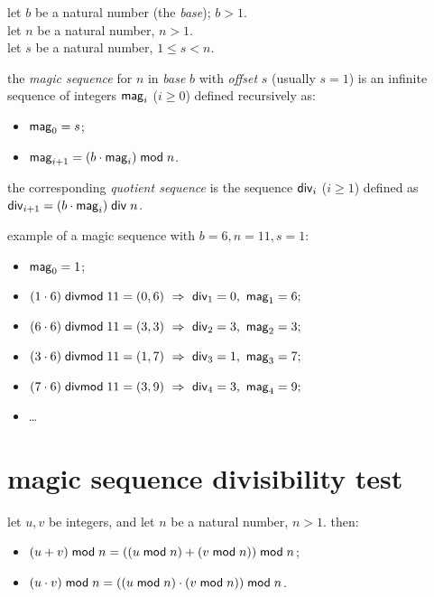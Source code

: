 \documentclass[a4paper, 12pt]{report}
\begin{document}
\begin{definition}
	let $b$ be a natural number (the \emph{base}); $b > 1$. \\
	let $n$ be a natural number, $n > 1$. \\
	let $s$ be a natural number, $1 \leq s < n$. \medskip

	the \emph{magic sequence} for $n$ in \emph{base} $b$ with \emph{offset} $s$ (usually $s = 1$) is an infinite sequence of integers $\mathsf{mag}_i$ ($i \geq 0$) defined recursively as:

	\begin{itemize}
		\item $\mathsf{mag}_0 = s$;
		\item $\mathsf{mag}_{i + 1} = (b \cdot \mathsf{mag}_i) \;\mathsf{mod}\; n$.
	\end{itemize}

	the corresponding \emph{quotient sequence} is the sequence $\mathsf{div}_i$ ($i \geq 1$) defined as \\ $\mathsf{div}_{i + 1} = (b \cdot \mathsf{mag}_i) \;\mathsf{div}\; n$.
\end{definition} \bigskip

example of a magic sequence with $b = 6, n = 11, s = 1$:

\begin{itemize}
	\item $\mathsf{mag}_0 = 1$;
	\item $(1 \cdot 6) \fdivmod 11 = (0, 6) \ \Rightarrow \ \m{div}_1 = 0, \ \m{mag}_1 = 6;$
	\item $(6 \cdot 6) \fdivmod 11 = (3, 3) \ \Rightarrow \ \m{div}_2 = 3, \ \m{mag}_2 = 3;$
	\item $(3 \cdot 6) \fdivmod 11 = (1, 7) \ \Rightarrow \ \m{div}_3 = 1, \ \m{mag}_3 = 7;$
	\item $(7 \cdot 6) \fdivmod 11 = (3, 9) \ \Rightarrow \ \m{div}_4 = 3, \ \m{mag}_4 = 9;$
	\item \ldots
\end{itemize}

\newpage

\section*{magic sequence divisibility test}

\begin{lemma}
	let $u, v$ be integers, and let $n$ be a natural number, $n > 1$. then:
	\begin{itemize}
		\item $(u + v) \;\mathsf{mod}\; n = ((u \;\mathsf{mod}\; n) + (v \;\mathsf{mod}\; n)) \;\mathsf{mod}\; n$;
		\item $(u \cdot v) \;\mathsf{mod}\; n = ((u \;\mathsf{mod}\; n) \cdot (v \;\mathsf{mod}\; n)) \;\mathsf{mod}\; n$.
	\end{itemize}
\end{lemma}
\end{document}
